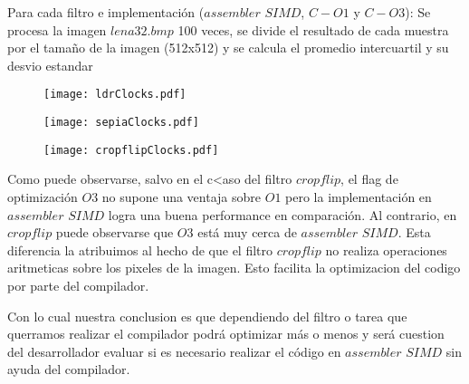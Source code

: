 Para cada filtro e implementación ($assembler$ $SIMD$, $C-O1$ y $C-O3$): Se procesa la imagen $lena32.bmp$ 100 veces, se divide el resultado de cada muestra por el tamaño de la imagen (512x512) y se calcula el promedio intercuartil y su desvio estandar

\begin{figure}[h]
  \begin{center}
	\texttt{[image: ldrClocks.pdf]}
  \end{center}
\end{figure}

\begin{figure}[h]
  \begin{center}
	\texttt{[image: sepiaClocks.pdf]}
  \end{center}
\end{figure}

\newpage

\begin{figure}
  \begin{center}
	\texttt{[image: cropflipClocks.pdf]}
  \end{center}
\end{figure}

Como puede observarse, salvo en el c<aso del filtro $cropflip$, el flag de optimización $O3$ no supone una ventaja sobre $O1$ pero la implementación en $assembler$ $SIMD$ logra una buena performance en comparación. Al contrario, en $cropflip$ puede observarse que $O3$ está muy cerca de $assembler$ $SIMD$. Esta diferencia la atribuimos al hecho de que el filtro $cropflip$ no realiza operaciones aritmeticas sobre los pixeles de la imagen. Esto facilita la optimizacion del codigo por parte del compilador. 

Con lo cual nuestra conclusion es que dependiendo del filtro o tarea que querramos realizar el compilador podrá optimizar más o menos y será cuestion del desarrollador evaluar si es necesario realizar el código en $assembler$ $SIMD$ sin ayuda del compilador. 

